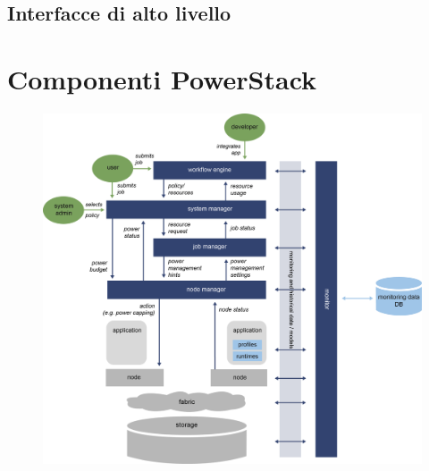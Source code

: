 \subsection{Interfacce di alto livello}



\section{Componenti PowerStack}
\begin{figure}
    \centering
    \includegraphics[width=\textwidth]{img/REGALE-Architecture-1536x1421.png}
\end{figure}
